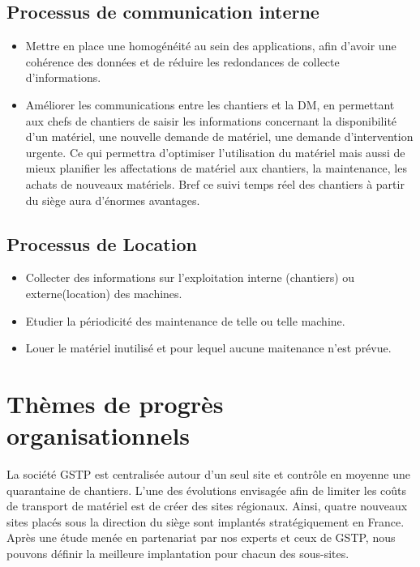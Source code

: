         \subsection{Processus de communication interne}
        \begin{itemize}
                \item Mettre en place une homogénéité au sein des applications, afin d'avoir une cohérence des données et de réduire les redondances de collecte d'informations.
                \item Améliorer les communications entre les chantiers et la DM, en permettant aux chefs de chantiers de saisir les informations concernant la disponibilité d'un matériel, une nouvelle demande de matériel, une demande d'intervention urgente. Ce qui permettra d'optimiser l'utilisation du matériel mais aussi de mieux planifier les affectations de matériel aux chantiers, la maintenance, les achats de nouveaux matériels. Bref ce suivi temps réel des chantiers à partir du siège aura d'énormes avantages.
        \end{itemize}
		
		\subsection{Processus de Location}
        \begin{itemize}
                \item Collecter des informations sur l'exploitation interne (chantiers) ou externe(location) des machines.
                \item Etudier la périodicité des maintenance de telle ou telle machine.
				\item Louer le matériel inutilisé et pour lequel aucune maitenance n'est prévue.
        \end{itemize}
		
\section{Thèmes de progrès organisationnels}

La société GSTP est centralisée autour d’un seul site et contrôle en moyenne une quarantaine de chantiers. 
L’une des évolutions envisagée afin de limiter les coûts de transport de matériel est de créer des sites régionaux.
Ainsi, quatre nouveaux sites placés sous la direction du siège sont implantés stratégiquement en France. 
Après une étude menée en partenariat par nos experts et ceux de GSTP, nous pouvons définir la meilleure implantation pour chacun des sous-sites.


